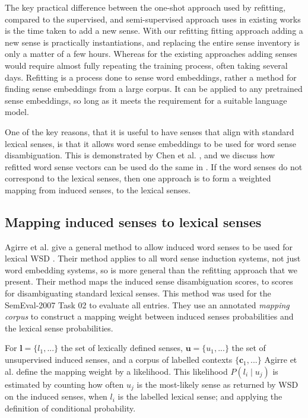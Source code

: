 \documentclass{sig-alternate}
\renewcommand{\c}{\mathbf{c}}
\renewcommand{\l}{\mathbf{l}}
\renewcommand{\u}{\mathbf{u}}
\begin{document}
The key practical difference between the one-shot approach used by refitting, compared to the supervised, and semi-supervised approach uses in existing works is the time taken to  add a new sense. With our refitting fitting approach adding a new sense is practically instantiations, and replacing the entire sense inventory is only a matter of a few hours. Whereas for the existing approaches adding senses would require almost fully repeating the training process, often taking several days. Refitting is a process done to sense word embeddings, rather a method for finding sense embeddings from a large corpus. It can be applied to any pretrained sense embeddings, so long as it meets the requirement for a suitable language model.

One of the key reasons, that it is useful to have senses that align with standard lexical senses, is that it allows word sense embeddings to be used for word sense disambiguation. This is demonstrated by Chen et al.  \parencite{Chen2014}, and we discuss how refitted word sense vectors can be used do the same in . If the word senses do not correspond to the lexical senses, then one approach is to form a weighted mapping from induced senses, to the lexical senses.

\subsection{Mapping induced senses to lexical senses}\label{mapping}
 Agirre et al. give a general method to allow induced word senses to be used for lexical WSD \parencite{agirre2006}.
Their method applies to all word sense induction systems, not just word embedding systems, so is more general than the refitting approach that we present.
Their method maps the induced sense disambiguation scores, to scores for disambiguating standard lexical senses. This method was used for the SemEval-2007 Task 02 \parencite{SemEval2007WSIandWSD} to evaluate all entries.
They use an annotated \emph{mapping corpus} to construct a mapping weight between induced senses probabilities and the lexical sense probabilities.

For $\l=\{l_1,...\}$ the set of lexically defined senses, $\u=\{u_1,...\}$ the set of unsupervised induced senses, and a corpus of labelled contexts $\{\c_1, ...\}$ Agirre et al. define the mapping weight by a likelihood.
This likelihood $P(l_i \mid u_j)$ is estimated by counting how often $u_j$ is the most-likely sense as returned by WSD on the induced senses, when $l_i$ is the labelled lexical sense; and applying the definition of conditional probability.
\end{document}
